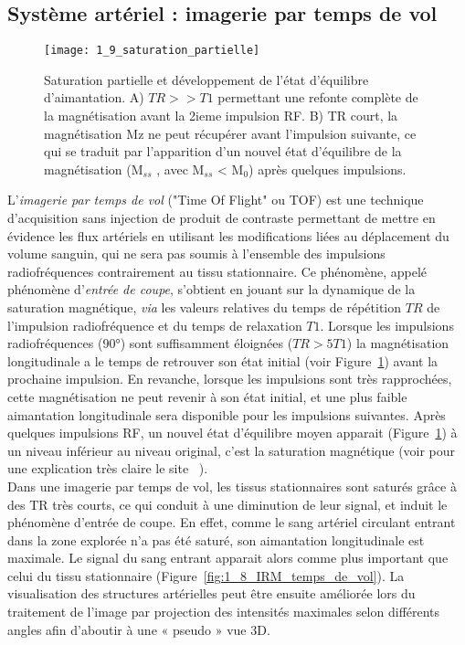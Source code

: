 \subsection{Système artériel : imagerie par temps de vol}
\begin{figure}[!t]
\centering
\texttt{[image: 1\_9\_saturation\_partielle]}
\caption{Saturation partielle et développement de l'état d'équilibre d'aimantation. A) $TR  >> T1$ permettant une refonte complète de la magnétisation avant la 2ieme impulsion RF. B) TR court, la magnétisation Mz ne peut récupérer avant l’impulsion suivante, ce qui se traduit par l’apparition d’un nouvel état d’équilibre de la magnétisation (M$_{ss}$ , avec M$_{ss}$ < M$_{0}$) après quelques impulsions. }
\label{fig:1_9_saturation_partielle}	
\end{figure}
L’{\em imagerie par temps de vol} ("Time Of Flight" ou TOF) est une technique d’acquisition sans injection de produit de contraste permettant de mettre en évidence les flux artériels en utilisant les modifications liées au déplacement du volume sanguin, qui ne sera pas soumis à l’ensemble des impulsions radiofréquences contrairement au tissu stationnaire. Ce phénomène, appelé phénomène d’{\em entrée de coupe}, s'obtient en jouant sur la dynamique de la saturation magnétique, {\em via} les valeurs relatives du temps de répétition $TR$ de l'impulsion radiofréquence et du temps de relaxation $T1$. Lorsque les impulsions radiofréquences (90°) sont suffisamment éloignées ($TR > 5  T1$) la magnétisation longitudinale a le temps de retrouver son état initial (voir Figure~\ref{fig:1_9_saturation_partielle}) avant la prochaine impulsion. En revanche, lorsque les impulsions sont très rapprochées, cette magnétisation ne peut revenir à son état initial, et une plus faible aimantation longitudinale sera disponible pour les impulsions suivantes. Après quelques impulsions RF, un nouvel état d’équilibre moyen apparait (Figure~\ref{fig:1_9_saturation_partielle}) à un niveau inférieur au niveau original, c’est la saturation magnétique (voir pour une explication très claire le site ~\cite{timeflighteffects}).\\
Dans une imagerie par temps de vol, les tissus stationnaires sont saturés grâce à des TR très courts, ce qui conduit à une diminution de leur signal, et induit le phénomène d’entrée de coupe. En effet, comme le sang artériel circulant entrant dans la zone explorée n’a pas été saturé, son aimantation longitudinale est maximale. Le signal du sang entrant apparait alors comme plus important que celui du tissu stationnaire (Figure~\ref{fig:1_8_IRM_temps_de_vol}). La visualisation des structures artérielles peut être ensuite améliorée lors du traitement de l'image par projection des intensités maximales selon différents angles afin d’aboutir à une « pseudo » vue 3D.\\
